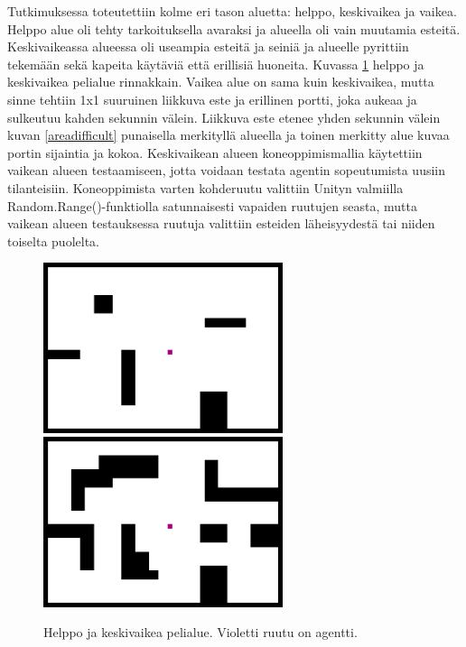 \documentclass[utf8]{gradu3}
\begin{document}
Tutkimuksessa toteutettiin kolme eri tason aluetta: helppo, keskivaikea ja vaikea. Helppo alue oli tehty tarkoituksella avaraksi ja alueella oli vain muutamia esteitä. Keskivaikeassa alueessa oli useampia esteitä ja seiniä ja alueelle pyrittiin tekemään sekä kapeita käytäviä että erillisiä huoneita. Kuvassa \ref{areabeginnerintermediate} helppo ja keskivaikea pelialue rinnakkain. Vaikea alue on sama kuin keskivaikea, mutta sinne tehtiin 1x1 suuruinen liikkuva este ja erillinen portti, joka aukeaa ja sulkeutuu kahden sekunnin välein. Liikkuva este etenee yhden sekunnin välein kuvan \ref{areadifficult} punaisella merkityllä alueella ja toinen merkitty alue kuvaa portin sijaintia ja kokoa. Keskivaikean alueen koneoppimismallia käytettiin vaikean alueen testaamiseen, jotta voidaan testata agentin sopeutumista uusiin tilanteisiin. Koneoppimista varten kohderuutu valittiin Unityn valmiilla Random.Range()-funktiolla satunnaisesti vapaiden ruutujen seasta, mutta vaikean alueen testauksessa ruutuja valittiin esteiden läheisyydestä tai niiden toiselta puolelta.

\begin{figure}[h]
\includegraphics[width=7cm]{area_beginner.png}
\includegraphics[width=7cm]{area_intermediate.png}
\centering
\caption{Helppo ja keskivaikea pelialue. Violetti ruutu on agentti.}
\label{areabeginnerintermediate}
\end{figure}
\end{document}

